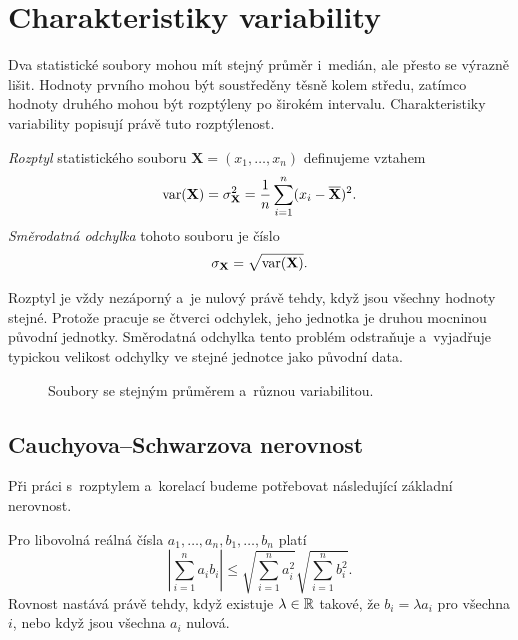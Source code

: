 \section{Charakteristiky variability}\label{sec:ai-charakteristiky-variability}

Dva statistické soubory mohou mít stejný průměr i~medián, ale přesto se výrazně lišit. Hodnoty prvního mohou být soustředěny těsně kolem středu, zatímco hodnoty druhého mohou být rozptýleny po širokém intervalu. Charakteristiky variability popisují právě tuto rozptýlenost.

\begin{definition}\label{def:ai-rozptyl}
    \emph{Rozptyl} statistického souboru
    \(\mathbf{X}=(x_1,\ldots,x_n)\) definujeme vztahem
    \[
        \operatorname{var}(\mathbf{X})
        =
        \sigma_{\mathbf{X}}^2
        =
        \frac1n\sum_{i=1}^{n}
        (x_i-\overline{\mathbf{X}})^2.
    \]
    \emph{Směrodatná odchylka} tohoto souboru je číslo
    \[
        \sigma_{\mathbf{X}}
        =
        \sqrt{\operatorname{var}(\mathbf{X})}.
    \]
\end{definition}

Rozptyl je vždy nezáporný a~je nulový právě tehdy, když jsou všechny hodnoty stejné. Protože pracuje se čtverci odchylek, jeho jednotka je druhou mocninou původní jednotky. Směrodatná odchylka tento problém odstraňuje a~vyjadřuje typickou velikost odchylky ve stejné jednotce jako původní data.

\begin{figure}[ht]
    \centering
    
    \caption{Soubory se stejným průměrem a~různou variabilitou.}
    \label{fig:ai-variabilita}
\end{figure}

\subsection{Cauchyova--Schwarzova nerovnost}

Při práci s~rozptylem a~korelací budeme potřebovat následující základní nerovnost.

\begin{theorem}\label{thm:ai-cauchy-schwarz}
    Pro libovolná reálná čísla
    \(a_1,\ldots,a_n,b_1,\ldots,b_n\) platí
    \[
        \left|
            \sum_{i=1}^{n}a_ib_i
        \right|
        \leqslant
        \sqrt{\sum_{i=1}^{n}a_i^2}
        \sqrt{\sum_{i=1}^{n}b_i^2}.
    \]
    Rovnost nastává právě tehdy, když existuje \(\lambda\in\mathbb{R}\) takové, že
    \(b_i=\lambda a_i\) pro všechna \(i\), nebo když jsou všechna \(a_i\) nulová.
\end{theorem}

